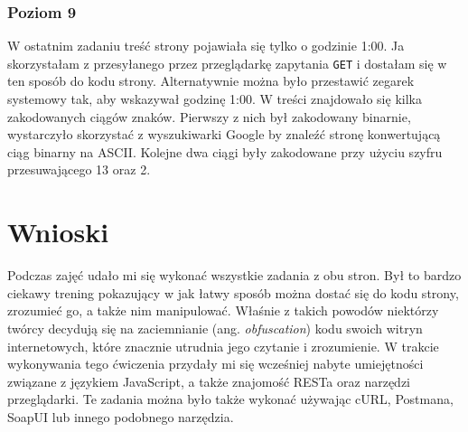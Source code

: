 \documentclass[12pt,a4paper,titlepage]{article}
\begin{document}
\subsubsection{Poziom 9}
W ostatnim zadaniu treść strony pojawiała się tylko o godzinie 1:00. Ja skorzystałam z przesyłanego przez przeglądarkę zapytania \texttt{GET} i dostałam się w ten sposób do kodu strony. Alternatywnie można było przestawić zegarek systemowy tak, aby wskazywał godzinę 1:00. W treści znajdowało się kilka zakodowanych ciągów znaków. Pierwszy z nich był zakodowany binarnie, wystarczyło skorzystać z wyszukiwarki Google by znaleźć stronę konwertującą ciąg binarny na ASCII. Kolejne dwa ciągi były zakodowane przy użyciu szyfru przesuwającego 13 oraz 2.

\section{Wnioski}
Podczas zajęć udało mi się wykonać wszystkie zadania z obu stron. Był to bardzo ciekawy trening pokazujący w jak łatwy sposób można dostać się do kodu strony, zrozumieć go, a także nim manipulować. Właśnie z takich powodów niektórzy twórcy decydują się na zaciemnianie (ang. \textit{obfuscation}) kodu swoich witryn internetowych, które znacznie utrudnia jego czytanie i zrozumienie. W trakcie wykonywania tego ćwiczenia przydały mi się wcześniej nabyte umiejętności związane z językiem JavaScript, a także znajomość RESTa oraz narzędzi przeglądarki. Te zadania można było także wykonać używając cURL, Postmana, SoapUI lub innego podobnego narzędzia.
\end{document}
